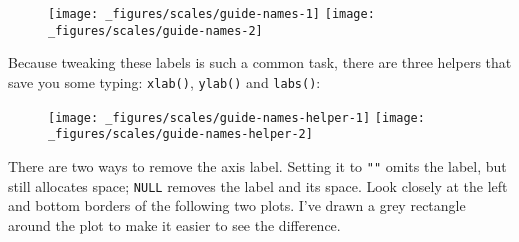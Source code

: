 \begin{figure}[H]
  \texttt{[image: \_figures/scales/guide-names-1]}%
  \texttt{[image: \_figures/scales/guide-names-2]}
\end{figure}

Because tweaking these labels is such a common task, there are three
helpers that save you some typing: \texttt{xlab()}, \texttt{ylab()} and
\texttt{labs()}:

\begin{Shaded}
\begin{Highlighting}[]
\StringTok{ }\StringTok{ }\NormalTok{(}\NormalTok{(} 
\StringTok{ }
\StringTok{  }\NormalTok{(}\NormalTok{) +}\StringTok{ }
\StringTok{  }\NormalTok{(}\NormalTok{)}
\StringTok{ }\NormalTok{(} \NormalTok{, } \NormalTok{, } \NormalTok{)}
\end{Highlighting}
\end{Shaded}

\begin{figure}[H]
  \texttt{[image: \_figures/scales/guide-names-helper-1]}%
  \texttt{[image: \_figures/scales/guide-names-helper-2]}
\end{figure}

There are two ways to remove the axis label. Setting it to \texttt{""}
omits the label, but still allocates space; \texttt{NULL} removes the
label and its space. Look closely at the left and bottom borders of the
following two plots. I've drawn a grey rectangle around the plot to make
it easier to see the difference.

\begin{Shaded}
\begin{Highlighting}[]
\StringTok{ }\StringTok{ }
\StringTok{  }\NormalTok{() +}\StringTok{ }
\StringTok{  }\NormalTok{(} \NormalTok{(} \NormalTok{))}
\StringTok{ }\NormalTok{(} \NormalTok{,  } \NormalTok{)}
\StringTok{ }\NormalTok{(} \NormalTok{, } \NormalTok{)}
\end{Highlighting}
\end{Shaded}

